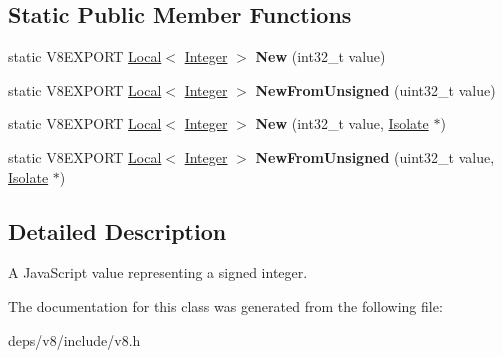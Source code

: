 \subsection*{Static Public Member Functions}
\begin{DoxyCompactItemize}
\item 
\hypertarget{classv8_1_1_integer_ab715913de664ee8934282de7b3ce4896}{}static V8\+E\+X\+P\+O\+R\+T \hyperlink{classv8_1_1_local}{Local}$<$ \hyperlink{classv8_1_1_integer}{Integer} $>$ {\bfseries New} (int32\+\_\+t value)\label{classv8_1_1_integer_ab715913de664ee8934282de7b3ce4896}

\item 
\hypertarget{classv8_1_1_integer_a5303f8909cf43e495c9524c923d5ffbe}{}static V8\+E\+X\+P\+O\+R\+T \hyperlink{classv8_1_1_local}{Local}$<$ \hyperlink{classv8_1_1_integer}{Integer} $>$ {\bfseries New\+From\+Unsigned} (uint32\+\_\+t value)\label{classv8_1_1_integer_a5303f8909cf43e495c9524c923d5ffbe}

\item 
\hypertarget{classv8_1_1_integer_a9905407109700f9821b31fff6b3d174f}{}static V8\+E\+X\+P\+O\+R\+T \hyperlink{classv8_1_1_local}{Local}$<$ \hyperlink{classv8_1_1_integer}{Integer} $>$ {\bfseries New} (int32\+\_\+t value, \hyperlink{classv8_1_1_isolate}{Isolate} $\ast$)\label{classv8_1_1_integer_a9905407109700f9821b31fff6b3d174f}

\item 
\hypertarget{classv8_1_1_integer_acff93c4ef5ab94d5534ffdf1c7f9ff5d}{}static V8\+E\+X\+P\+O\+R\+T \hyperlink{classv8_1_1_local}{Local}$<$ \hyperlink{classv8_1_1_integer}{Integer} $>$ {\bfseries New\+From\+Unsigned} (uint32\+\_\+t value, \hyperlink{classv8_1_1_isolate}{Isolate} $\ast$)\label{classv8_1_1_integer_acff93c4ef5ab94d5534ffdf1c7f9ff5d}

\end{DoxyCompactItemize}


\subsection{Detailed Description}
A Java\+Script value representing a signed integer. 

The documentation for this class was generated from the following file\+:\begin{DoxyCompactItemize}
\item 
deps/v8/include/v8.\+h\end{DoxyCompactItemize}
